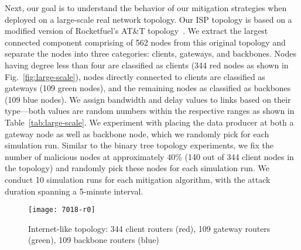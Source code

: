 
Next, our goal is to understand the behavior of our mitigation strategies when deployed on a large-scale real network topology. Our ISP topology is based on a modified version of Rocketfuel's AT\&T topology~\cite{rocketfuel}.
We extract the largest connected component comprising of 562 nodes from this original topology and separate the nodes into three categories: clients, gateways, and backbones. Nodes having degree less than four are classified as clients (344 red nodes as shown in Fig.~\ref{fig:large-scale}), nodes directly connected to clients are classified as gateways (109 green nodes), and the remaining nodes as classified as backbones (109 blue nodes). 
We assign bandwidth and  delay values to links based on their type---both values are random numbers within the respective ranges as shown in Table~\ref{tab:large-scale}. We experiment with placing the data producer at both a gateway node as well as backbone node, which we randomly pick for each simulation run. Similar to the binary tree topology experiments, we fix the number of malicious nodes at approximately 40\% (140 out of 344 client nodes in the topology) and randomly pick these nodes for each simulation run. We conduct 10 simulation runs for each mitigation algorithm, with the attack duration spanning a 5-minute interval.

\begin{figure}[htbp]
  \centering
  \vspace{-.1cm}\texttt{[image: 7018-r0]}
  \caption{Internet-like topology: 344 client routers (red), 109 gateway routers (green), 109 backbone routers (blue)}\vspace{-.2cm}
  \label{fig:large-scale-topo}
\end{figure}

